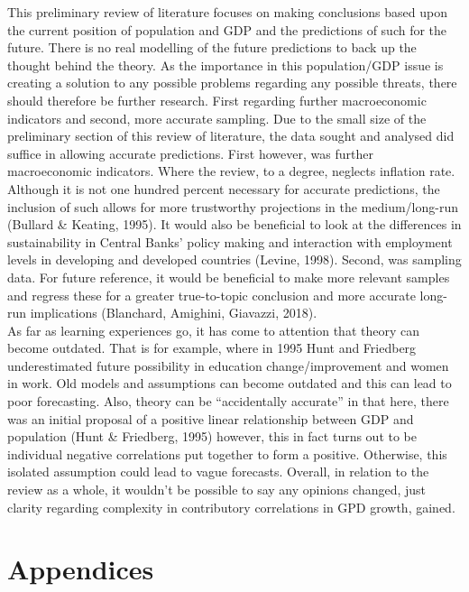 \documentclass[11pt, english]{article}
\begin{document}
	This preliminary review of literature focuses on making conclusions based upon the current position of population and GDP and the predictions of such for the future. There is no real modelling of the future predictions to back up the thought behind the theory. As the importance in this population/GDP issue is creating a solution to any possible problems regarding any possible threats, there should therefore be further research. First regarding further macroeconomic indicators and second, more accurate sampling. Due to the small size of the preliminary section of this review of literature, the data sought and analysed did suffice in allowing accurate predictions. First however, was further macroeconomic indicators. Where the review, to a degree, neglects inflation rate. Although it is not one hundred percent necessary for accurate predictions, the inclusion of such allows for more trustworthy projections in the medium/long-run (Bullard \& Keating, 1995). It would also be beneficial to look at the differences in sustainability in Central Banks’ policy making and interaction with employment levels in developing and developed countries (Levine, 1998). Second, was sampling data. For future reference, it would be beneficial to make more relevant samples and regress these for a greater true-to-topic conclusion and more accurate long-run implications (Blanchard, Amighini, Giavazzi, 2018).\\

	As far as learning experiences go, it has come to attention that theory can become outdated. That is for example, where in 1995 Hunt and Friedberg underestimated future possibility in education change/improvement and women in work. Old models and assumptions can become outdated and this can lead to poor forecasting. Also, theory can be “accidentally accurate” in that here, there was an initial proposal of a positive linear relationship between GDP and population (Hunt \& Friedberg, 1995) however, this in fact turns out to be individual negative correlations put together to form a positive. Otherwise, this isolated assumption could lead to vague forecasts. Overall, in relation to the review as a whole, it wouldn’t be possible to say any opinions changed, just clarity regarding complexity in contributory correlations in GPD growth, gained.

\newpage

\section{Appendices}
\end{document}
